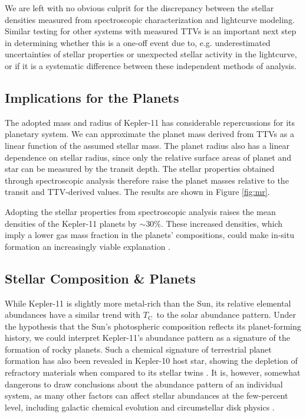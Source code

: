\documentclass[twocolumn,trackchanges]{aastex61}
\newcommand{\tc}{$T_\mathrm{C}$}
\begin{document}
We are left with no obvious culprit for the discrepancy between the stellar densities measured from spectroscopic characterization and lightcurve modeling. Similar testing for other systems with measured TTVs is an important next step in determining whether this is a one-off event due to, e.g. underestimated uncertainties of stellar properties or unexpected stellar activity in the lightcurve, or if it is a systematic difference between these independent methods of analysis. 

\subsection{Implications for the Planets}

The adopted mass and radius of Kepler-11 has considerable repercussions for its planetary system. We can approximate the planet mass derived from TTVs as a linear function of the assumed stellar mass. The planet radius also has a linear dependence on stellar radius, since only the relative surface areas of planet and star can be measured by the transit depth. The stellar properties obtained through spectroscopic analysis therefore raise the planet masses  relative to the transit and TTV-derived values. The results are shown in Figure \ref{fig:mr}.

Adopting the stellar properties from spectroscopic analysis raises the mean densities of the Kepler-11 planets by $\sim$30\%. These increased densities, which imply a lower gas mass fraction in the planets' compositions, could make in-situ formation an increasingly viable explanation \citep[see e.g.][]{Lee2014}.

\subsection{Stellar Composition \& Planets}

While Kepler-11 is slightly more metal-rich than the Sun, its relative elemental abundances have a similar trend with \tc\ to the solar abundance pattern. Under the \citet{Melendez2009} hypothesis that the Sun's photospheric composition reflects its planet-forming history, we could interpret Kepler-11's abundance pattern as a signature of the formation of rocky planets. Such a chemical signature of terrestrial planet formation has also been revealed in Kepler-10 host star, showing the depletion of refractory materials when compared to its stellar twins \citep{Liu2016}. It is, however, somewhat dangerous to draw conclusions about the abundance pattern of an individual system, as many other factors can affect stellar abundances at the few-percent level, including galactic chemical evolution and circumstellar disk physics \citep{Gaidos2015}.
\end{document}
